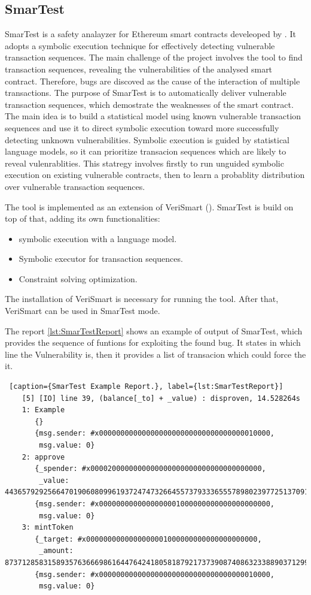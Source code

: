 \subsection{SmarTest}
\label{sec:WithoutSpecification:SmarTest}

SmarTest is a safety analayzer for Ethereum smart contracts develeoped by \citet{SmarTest}. 
It adopts a symbolic execution technique for effectively detecting vulnerable transaction sequences. 
The main challenge of the project involves the tool to find transaction sequences,
revealing the vulnerabilities of the analysed smart contract. Therefore, bugs are discoved as the cause of the interaction of multiple transactions.
The purpose of SmarTest is to automatically deliver vulnerable transaction sequences, 
which demostrate the weaknesses of the smart contract.
The main idea is to build a statistical model using known vulnerable transaction sequences and use it to direct symbolic execution toward 
more successfully detecting unknown vulnerabilities. 
Symbolic execution is guided by statistical language models, so it can prioritize transacion sequences which are likely to reveal vulenrablities.
This statregy involves firstly to run unguided symbolic
execution on existing vulnerable contracts, then to learn a probablity distribution over vulnerable transaction sequences.

The tool is implemented as an extension of VeriSmart (\citet{VeriSmart}).
SmarTest is build on top of that, adding its own functionalities:
\begin{itemize}
    \item symbolic execution with a language model.
    \item Symbolic executor for transaction sequences.
    \item Constraint solving optimization.
\end{itemize}
The installation of VeriSmart is necessary for running the tool. After that, VeriSmart can be used in SmarTest mode.

The report \autoref{lst:SmarTestReport} shows an example of output of SmarTest, which provides the sequence of funtions for exploiting the found bug. 
It states in which line the Vulnerability is, then it provides a list of transacion which could force the it. 

\begin{lstlisting} [caption={SmarTest Example Report.}, label={lst:SmarTestReport}]
    [5] [IO] line 39, (balance[_to] + _value) : disproven, 14.528264s
    1: Example
       {}
       {msg.sender: #x0000000000000000000000000000000000010000,
        msg.value: 0}
    2: approve
       {_spender: #x0000200000000000000000000000000000000000,
        _value: 44365792925664701906080996193724747326645573793336555789802397725137091694592}
       {msg.sender: #x0000000000000000001000000000000000000000,
        msg.value: 0}
    3: mintToken
       {_target: #x0000000000000000001000000000000000000000,
        _amount: 87371285831589357636669861644764241805818792173739087408632338890371299803136}
       {msg.sender: #x0000000000000000000000000000000000010000,
        msg.value: 0}
\end{lstlisting}

